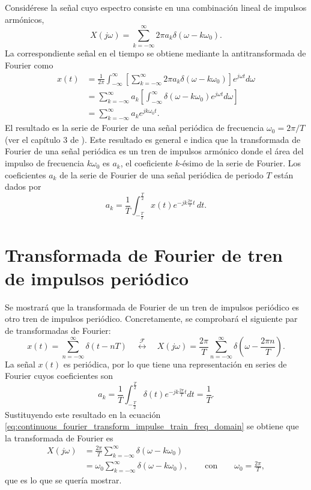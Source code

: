 \documentclass[a4paper]{report}
\begin{document}
Considérese la señal cuyo espectro consiste en una combinación lineal de impulsos armónicos,
\begin{equation}\label{eq:continuous_fourier_transform_impulse_train_freq_domain}
X(j\omega)=\sum_{k=-\infty}^{\infty}2\pi a_k\delta(\omega-k\omega_0).
\end{equation}
La correspondiente señal en el tiempo se obtiene mediante la antitransformada de Fourier como
\begin{align*}
x(t)&=\frac{1}{2\pi}\int_{-\infty}^{\infty}\left[\sum_{k=-\infty}^{\infty}2\pi a_k\delta(\omega-k\omega_0)\right]e^{j\omega t}d\omega\\
&=\sum_{k=-\infty}^{\infty} a_k\left[\int_{-\infty}^{\infty}\delta(\omega-k\omega_0)e^{j\omega t}d\omega\right]\\
&=\sum_{k=-\infty}^{\infty} a_ke^{jk\omega_0 t}.
\end{align*}
El resultado es la serie de Fourier de una señal periódica de frecuencia \(\omega_0=2\pi/T\) (ver el capítulo 3 de \cite{oppenheim1997signals}). Este resultado es general e indica que la transformada de Fourier de una señal periódica es un tren de impulsos armónico donde el área del impulso de frecuencia \(k\omega_0\) es \(a_k\), el coeficiente \(k\)-ésimo  de la serie de Fourier. Los coeficientes \(a_k\) de la serie de Fourier de una señal periódica de periodo \(T\) están dados por
\begin{equation}\label{eq:fourier_series_coefficients}
 a_k=\frac{1}{T}\int_{-\frac{T}{2}}^{\frac{T}{2}}x(t)e^{-jk\frac{2\pi}{T}t}\,dt. 
\end{equation}

\section{Transformada de Fourier de tren de impulsos periódico}

Se mostrará que la transformada de Fourier de un tren de impulsos periódico es otro tren de impulsos periódico. Concretamente, se comprobará el siguiente par de transformadas de Fourier:
\begin{equation}\label{eq:continous_fourier_transform_impulse_train}
  x(t)=\sum_{n=-\infty}^{\infty}\delta(t-nT)
  \quad\overset{\mathcal{F}}{\longleftrightarrow}\quad
  X(j\omega)=\frac{2\pi}{T}\sum_{n=-\infty}^{\infty}\delta\left(\omega-\frac{2\pi n}{T}\right).
\end{equation}
La señal \(x(t)\) es periódica, por lo que tiene una representación en series de  Fourier cuyos coeficientes son
\[
a_k=\frac{1}{T}\int_{-\frac{T}{2}}^{\frac{T}{2}}\delta(t)e^{-jk\frac{2\pi}{T}t}dt=\frac{1}{T}.
\]
Sustituyendo este resultado en la ecuación \ref{eq:continuous_fourier_transform_impulse_train_freq_domain} se obtiene que la transformada de Fourier es
\begin{align*}
 X(j\omega)&=\frac{2\pi}{T}\sum_{k=-\infty}^{\infty}\delta(\omega-k\omega_0)\\
  &=\omega_0\sum_{k=-\infty}^{\infty}\delta(\omega-k\omega_0),
  \qquad\textrm{con}\qquad\omega_0=\frac{2\pi}{T},
\end{align*}
que es lo que se quería mostrar.
\end{document}
